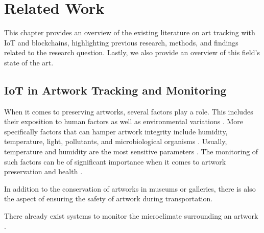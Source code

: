 \chapter{Related Work}
\label{chap:related_work}
This chapter provides an overview of the existing literature on art tracking with IoT and blockchains, highlighting previous research, methods, and findings related to the research question. Lastly, we also provide an overview of this field's state of the art.

\section{IoT in Artwork Tracking and Monitoring}
When it comes to preserving artworks, several factors play a role. This includes their exposition to human factors as well as environmental variations \cite{woodenartworkmonitoring}. More specifically factors that can hamper artwork integrity include humidity, temperature, light, pollutants, and microbiological organisms \cite{riskassessment}. Usually, temperature and humidity are the most sensitive parameters \cite{riskassessment}. The monitoring of such factors can be of significant importance when it comes to artwork preservation and health \cite{environmentmonitoring}. 

In addition to the conservation of artworks in museums or galleries, there is also the aspect of ensuring the safety of artwork during transportation. 

There already exist systems to monitor the microclimate surrounding an artwork \cite{monitoringplatform}. 
